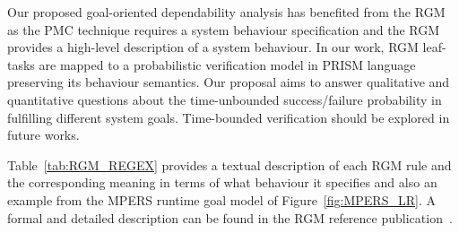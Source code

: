 Our proposed goal-oriented dependability analysis has benefited from the RGM as the PMC technique requires a system behaviour specification and the RGM provides a high-level description of a system behaviour. In our work, RGM leaf-tasks are mapped to a probabilistic verification model in PRISM language preserving its behaviour semantics. Our proposal aims to answer qualitative and quantitative questions about the time-unbounded success/failure probability in fulfilling different system goals. Time-bounded verification should be explored in future works.



Table~\ref{tab:RGM_REGEX} provides a textual description of each RGM rule and the corresponding meaning in terms of what behaviour it specifies and also an example from the MPERS runtime goal model of Figure~\ref{fig:MPERS_LR}. A formal and detailed description can be found in the RGM reference publication~\cite{Dalpiaz:2013}.

